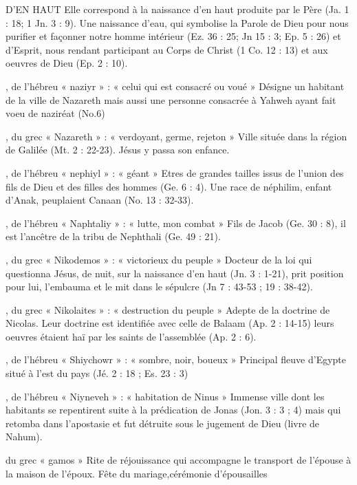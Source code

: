 \begin{multicols}{2}
D'EN HAUT
Elle correspond à la naissance d'en haut produite par le Père (Ja. 1 : 18; 1 Jn. 3 : 9). Une naissance d'eau, qui symbolise la Parole de Dieu pour nous purifier et façonner notre homme intérieur (Ez. 36 : 25; Jn 15 : 3; Ep. 5 : 26) et d'Esprit, nous rendant participant au Corps de Christ (1 Co. 12 : 13) et aux oeuvres de Dieu (Ep. 2 : 10).


, de l'hébreu « naziyr » : « celui qui est consacré ou voué »
Désigne un habitant de la ville de Nazareth mais aussi une personne consacrée à Yahweh ayant fait voeu de naziréat (No.6)


, du grec « Nazareth » : « verdoyant, germe, rejeton »
Ville située dans la région de Galilée (Mt. 2 : 22-23). Jésus y passa son enfance.


, de l'hébreu « nephiyl » : « géant »
Etres de grandes tailles issus de l'union des fils de Dieu et des filles des hommes (Ge. 6 : 4). Une race de néphilim, enfant d'Anak, peuplaient Canaan (No. 13 : 32-33).


, de l'hébreu « Naphtaliy » : « lutte, mon combat »
Fils de Jacob (Ge. 30 : 8), il est l'ancêtre de la tribu de Nephthali (Ge. 49 : 21).


, du grec « Nikodemos » : « victorieux du peuple »
Docteur de la loi qui questionna Jésus, de nuit, sur la naissance d'en haut (Jn. 3 : 1-21), prit position pour lui, l'embauma et le mit dans le sépulcre (Jn 7 : 43-53 ; 19 : 38-42).


, du grec « Nikolaites » : « destruction du peuple »
Adepte de la doctrine de Nicolas. Leur doctrine est identifiée avec celle de Balaam (Ap. 2 : 14-15) leurs oeuvres étaient haï par les saints de l'assemblée (Ap. 2 : 6).


, de l'hébreu « Shiychowr » : « sombre, noir, boueux »
Principal fleuve d’Egypte situé à l'est du pays (Jé. 2 : 18 ; Es. 23 : 3)


, de l'hébreu « Niyneveh » : « habitation de Ninus »
Immense ville dont les habitants se repentirent suite à la prédication de Jonas (Jon. 3 : 3 ; 4) mais qui retomba dans l'apostasie et fut détruite sous le jugement de Dieu (livre de Nahum).


du grec « gamos »
Rite de réjouissance qui accompagne le transport de l'épouse à la maison de l'époux.
Fête du mariage,cérémonie d’épousailles



\end{multicols}
